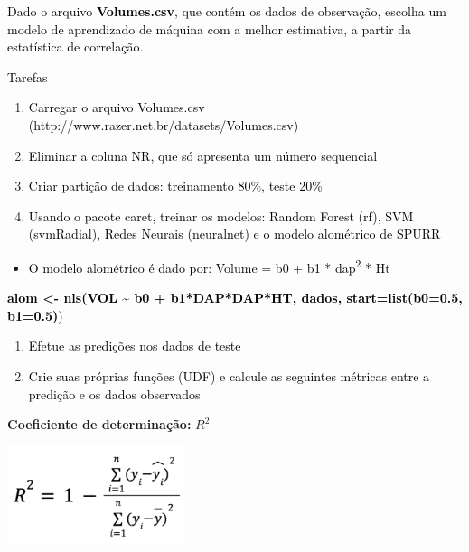 \textcolor{black}{Dado o arquivo }\textbf{\textcolor{black}{Volumes.csv}}\textcolor{black}{, que contém os dados de
observação, escolha um modelo de aprendizado de máquina com a melhor estimativa, a partir da estatística de
correlação.}



\textcolor{black}{Tarefas}

\begin{enumerate}[series=listWWNumxx,label=\arabic*.,ref=\arabic*]
\item \textcolor{black}{Carregar o arquivo Volumes.csv (http://www.razer.net.br/datasets/Volumes.csv)}
\item \textcolor{black}{Eliminar a coluna NR, que só apresenta um número sequencial}
\item \textcolor{black}{Criar partição de dados: treinamento 80\%, teste 20\%}
\item \textcolor{black}{Usando o pacote {\textquotedbl}caret{\textquotedbl}, treinar os modelos: Random Forest (rf), SVM
(svmRadial), Redes Neurais (neuralnet) e o modelo alométrico de SPURR}
\end{enumerate}

\begin{itemize}
\item \textcolor{black}{O modelo alométrico é dado por: Volume = b0 + b1 *
dap}\textcolor{black}{\textsuperscript{2}}\textcolor{black}{ * Ht}
\end{itemize}


\foreignlanguage{english}{\textbf{\textcolor{black}{alom {\textless}- nls(VOL \textasciitilde{} b0 + b1*DAP*DAP*HT, dados,
start=list(b0=0.5, b1=0.5)}}}\foreignlanguage{english}{\textcolor{black}{)}}



\begin{enumerate}[resume*=listWWNumxx,start=5]
\item \textcolor{black}{Efetue as predições nos dados de teste}
\item \textcolor{black}{Crie suas próprias funções (UDF) e calcule as seguintes métricas entre a predição e os dados
observados}
\end{enumerate}


\textbf{Coeficiente de determinação: }$R^2$

\begin{center}
\includegraphics[width=5.191cm,height=2.9cm]{apendices/fig/IAA003_1.png} 
\end{center}

